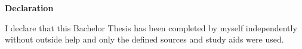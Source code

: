 \clearpage
\thispagestyle{plain}
\ITocEntryStatement
\textbf{\sffamily\large Declaration}

I declare that this Bachelor Thesis has been completed
by myself independently without outside help
and only the defined sources and study aids were used.


\vspace{1cm}
\noindent\makebox[3cm]{\hrulefill} \hspace{0.1cm}
    \makebox[3cm]{\hrulefill} \hspace{0.1cm}
    \makebox[6cm]{\hrulefill} \\
\noindent{} \hspace{0.1cm}
     \hspace{0.1cm}

\clearpage
